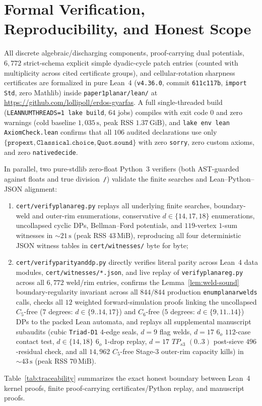 \documentclass[11pt,reqno]{amsart}
\theoremstyle{plain}
\theoremstyle{definition}
\theoremstyle{remark}
\DeclareRobustCommand{\_}{\ifmmode\text{\textunderscore}\else\textunderscore\allowbreak\fi}
\begin{document}
\section{Formal Verification, Reproducibility, and Honest Scope}\label{sec:verification}

All discrete algebraic/discharging components, proof-carrying dual potentials, $6{,}772$ strict-schema explicit simple dyadic-cycle patch entries (counted with multiplicity across cited certificate groups), and cellular-rotation sharpness certificates are formalized in pure Lean~4 (\texttt{v4.36.0}, commit \texttt{611c117b}, \texttt{import Std}, zero Mathlib) inside \texttt{paper1\_planar/lean/} at \url{https://github.com/lollipoll/erdos-gyarfas}. A full single-threaded build (\texttt{LEAN\_NUM\_THREADS=1 lake build}, $64$ jobs) compiles with exit code $0$ and zero warnings (cold baseline $1{,}035\,\mathrm{s}$, peak RSS $1.37\,\mathrm{GiB}$), and \texttt{lake env lean AxiomCheck.lean} confirms that all $106$ audited declarations use only $\{\texttt{propext}, \texttt{Classical.choice}, \texttt{Quot.sound}\}$ with zero \texttt{sorry}, zero custom axioms, and zero \texttt{native\_decide}.

In parallel, two pure-stdlib zero-float Python~3 verifiers (both AST-guarded against floats and true division~\texttt{/}) validate the finite searches and Lean--Python--JSON alignment:
\begin{enumerate}[label=(\alph*),leftmargin=2.2em]
  \item \texttt{cert/verify\_planar\_eg.py} replays all underlying finite searches, boundary-weld and outer-rim enumerations, conservative $d \in \{14,17,18\}$ enumerations, uncollapsed cyclic DPs, Bellman--Ford potentials, and $119$-vertex $1$-sum witnesses in ${\sim}21\,\mathrm{s}$ (peak RSS $43\,\mathrm{MiB}$), reproducing all four deterministic JSON witness tables in \texttt{cert/witnesses/} byte for byte;
  \item \texttt{cert/verify\_parity\_and\_dp.py} directly verifies literal parity across Lean~4 data modules, \texttt{cert/witnesses/*.json}, and live replay of \texttt{verify\_planar\_eg.py} across all $6{,}772$ weld/rim entries, confirms the Lemma~\ref{lem:weld-sound} boundary-regularity invariant across all $844/844$ production \texttt{enum\_planar\_welds} calls, checks all $12$ weighted forward-simulation proofs linking the uncollapsed $C_5$-free ($7$ degrees: $d \in \{9..14, 17\}$) and $C_6$-free ($5$ degrees: $d \in \{9, 11..14\}$) DPs to the packed Lean automata, and replays all supplemental manuscript subaudits (cubic \texttt{Triad-D1} $4$-edge seals, $d = 9$ flag welds, $d = 17$ $6_o$ $112$-case contact test, $d \in \{14, 18\}$ $6_o$ $1$-drop replay, $d = 17$ $TP_{s3}$ $(0..3)$ post-sieve $496$-residual check, and all $14{,}962$ $C_5$-free Stage-3 outer-rim capacity kills) in ${\sim}43\,\mathrm{s}$ (peak RSS $70\,\mathrm{MiB}$).
\end{enumerate}
Table~\ref{tab:traceability} summarizes the exact honest boundary between Lean~4 kernel proofs, finite proof-carrying certificates/Python replay, and manuscript proofs.
\end{document}
